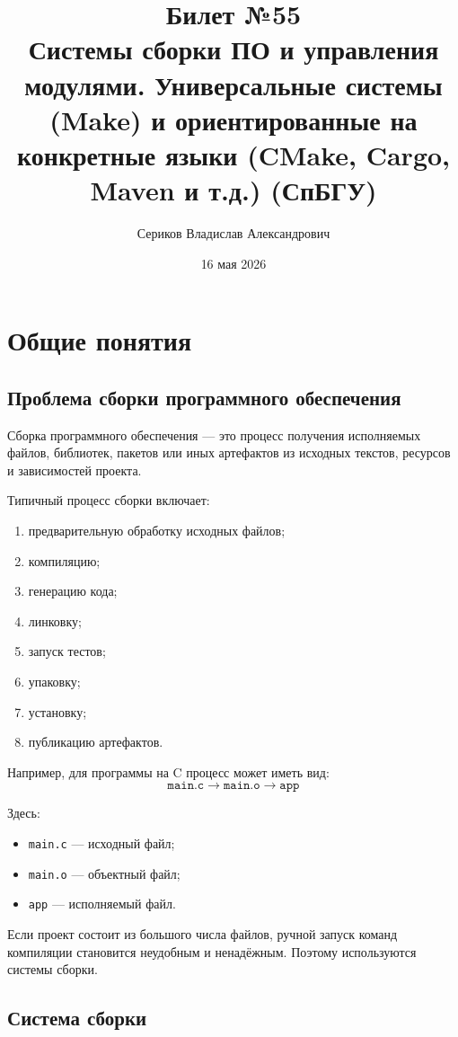 \documentclass[12pt,a4paper]{article}
\title{Билет №55 \\ \small Системы сборки ПО и управления модулями. Универсальные системы (Make) и ориентированные на конкретные языки (CMake, Cargo, Maven и т.д.) (СпБГУ)}
\author{Сериков Владислав Александрович}
\date{16 мая 2026}
\begin{document}
\maketitle
\tableofcontents
\newpage

\section{Общие понятия}

\subsection{Проблема сборки программного обеспечения}

Сборка программного обеспечения --- это процесс получения исполняемых файлов, библиотек, пакетов или иных артефактов из исходных текстов, ресурсов и зависимостей проекта.

Типичный процесс сборки включает:
\begin{enumerate}
    \item предварительную обработку исходных файлов;
    \item компиляцию;
    \item генерацию кода;
    \item линковку;
    \item запуск тестов;
    \item упаковку;
    \item установку;
    \item публикацию артефактов.
\end{enumerate}

Например, для программы на C процесс может иметь вид:
\[
\texttt{main.c} \longrightarrow \texttt{main.o} \longrightarrow \texttt{app}
\]

Здесь:
\begin{itemize}
    \item \texttt{main.c} --- исходный файл;
    \item \texttt{main.o} --- объектный файл;
    \item \texttt{app} --- исполняемый файл.
\end{itemize}

Если проект состоит из большого числа файлов, ручной запуск команд компиляции становится неудобным и ненадёжным. Поэтому используются системы сборки.

\subsection{Система сборки}
\end{document}
